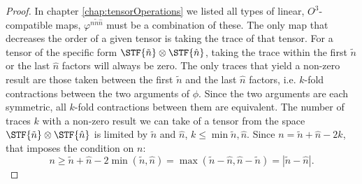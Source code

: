 {\begin{proof}
	In chapter \ref{chap:tensorOperations} we listed all types of linear, $O^3$-compatible maps, $\varphi^{n\tilde{n}\hat{n}}$ must be a combination of these. The only map that decreases the order of a given tensor is taking the trace of that tensor. For a tensor of the specific form $\STF{\tilde{n}}\otimes\STF{\hat{n}}$, taking the trace within the first $\tilde{n}$ or the last $\hat{n}$ factors will always be zero. The only traces that yield a non-zero result are those taken between the first $\tilde{n}$ and the last $\hat{n}$ factors, i.e. $k$-fold contractions between the two arguments of $\phi$. Since the two arguments are each symmetric, all $k$-fold contractions between them are equivalent. The number of traces $k$ with a non-zero result we can take of a tensor from the space $\STF{\tilde{n}}\otimes\STF{\hat{n}}$ is limited by $\tilde{n}$ and $\hat{n}$, $k\leq \min{\tilde{n},\hat{n}}$. Since $n=\tilde{n}+\hat{n}-2k$, that imposes the condition on $n$:
	\[n \geq \tilde{n}+\hat{n}-2\min(\tilde{n},\hat{n}) = \max(\tilde{n}-\hat{n},\hat{n}-\tilde{n}) = |\tilde{n}-\hat{n}|.\]
	

\end{proof}}
